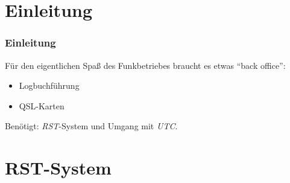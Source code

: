 

\subtitle{Betriebstechnik/Vorschriften 13: \\
RST-System, UTC, Logbuch, QSL-Karte \\[2em]}
\date{Stand 18.09.2017}


\section{Einleitung}

\begin{frame}
  \frametitle{Einleitung}

  Für den eigentlichen Spaß des Funkbetriebes braucht es etwas ``back
  office'':

  \begin{itemize}
    \item Logbuchführung
    \item QSL-Karten
  \end{itemize}

  \vspace{1cm}

  Benötigt: \emph{RST}-System und Umgang mit \emph{UTC}.

\end{frame}

\section{RST-System}

